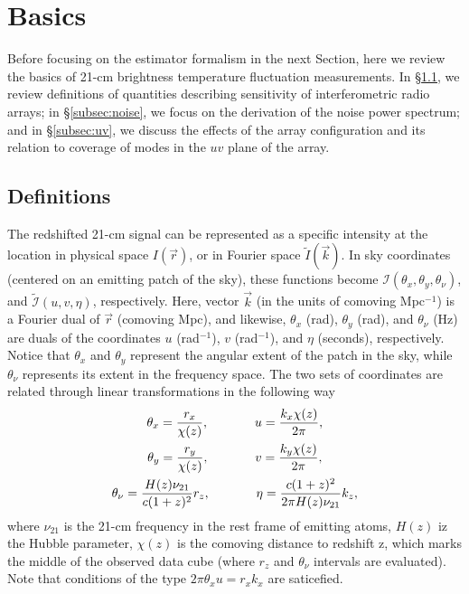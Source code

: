 \section{Basics}
\label{sec:basics}

Before focusing on the estimator formalism in the next Section, here we review the basics of 21-cm brightness temperature fluctuation measurements. In \S\ref{subsec:def}, we review definitions of quantities describing sensitivity of interferometric radio arrays; in \S\ref{subsec:noise}, we focus on the derivation of the noise power spectrum; and in \S\ref{subsec:uv}, we discuss the effects of the array configuration and its relation to coverage of modes in the $uv$ plane of the array. 

\subsection{Definitions}
\label{subsec:def}

The redshifted 21-cm signal can be represented as a specific intensity at  the location in physical space $I(\vec{r})$, or in Fourier space $\widetilde{I}(\vec{k})$. In sky coordinates (centered on an emitting patch of the sky), these functions become $\mathcal{I}(\theta_x, \theta_y, \theta_\nu)$, and $\widetilde{\mathcal{I}}(u,v,\eta)$, respectively. Here, vector $\vec{k}$ (in the units of comoving Mpc$^{-1}$) is a Fourier dual of $\vec{r}$ (comoving Mpc), and likewise, $\theta_x$ (rad), $\theta_y$ (rad), and $\theta_\nu$ (Hz) are duals of the coordinates $u$ (rad$^{-1}$), $v$ (rad$^{-1}$), and $\eta$ (seconds), respectively.  Notice that $\theta_x$ and $\theta_y$ represent the angular extent of the patch in the sky, while $\theta_\nu$ represents its extent in the frequency space. The two sets of coordinates are related through linear transformations in the following way
\begin{equation}
\begin{gathered}
\theta_x = \frac{r_x}{\chi(z)}, \hspace{0.5in} u = \frac{k_x\chi(z)}{2\pi},\\
\theta_y = \frac{r_y}{\chi(z)}, \hspace{0.5in} v = \frac{k_y\chi(z)}{2\pi},\\
\theta_\nu = \frac{H(z)\nu_{21}}{c(1+z)^2} r_z, \hspace{0.5in} \eta = \frac{c(1+z)^2}{2\pi H(z)\nu_{21}}k_z,
\end{gathered}
\label{eq:fourier_duals}
\end{equation} 
where $\nu_{21}$ is the 21-cm frequency in the rest frame of emitting atoms, $H(z)$ iz the Hubble parameter, $\chi(z)$ is the comoving distance to redshift z, which marks the middle of the observed data cube (where $r_z$ and $\theta_\nu$ intervals are evaluated). Note that conditions of the type $2\pi\theta_xu = r_xk_x$ are saticefied.


